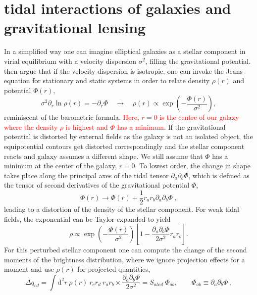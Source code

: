 \documentclass[a4paper,fleqn,usenatbib]{mnras}
\newcommand\spirou[1]{\textcolor{red}{#1}}
\newcommand{\dd}{\mathrm{d}}
\begin{document}
\section{tidal interactions of galaxies and gravitational lensing}\label{sect_tidal}
In a simplified way one can imagine elliptical galaxies as a stellar component in virial equilibrium with a velocity dispersion $\sigma^2$, filling the gravitational potential. \citet{piras_mass_2018} then argue that if the velocity dispersion is isotropic, one can invoke the Jeans-equation for stationary and static systems in order to relate density $\rho(r)$ and potential $\Phi(r)$,
\begin{equation}
\sigma^2\partial_r\ln\rho(r) = -\partial_r\Phi
\quad\rightarrow\quad
\rho(r) \propto \exp\left(-\frac{\Phi(r)}{\sigma^2}\right),
\label{eqn_jeans}
\end{equation}
reminiscent of the barometric formula. \spirou{Here, $r = 0$ is the centre of our galaxy where the density $\rho$ is highest and $\Phi$ has a minimum.} If the gravitational potential is distorted by external fields as the galaxy is not an isolated object, the equipotential contours get distorted correspondingly and the stellar component reacts and galaxy assumes a different shape.  We still assume that  $\Phi$ has a minimum at the center of the galaxy, $r = 0$. To lowest order, the change in shape takes place along the principal axes of the tidal tensor $\partial_a\partial_b\Phi$, which is defined as the tensor of second derivatives of the gravitational potential $\Phi$,
\begin{equation}
\Phi(r) \rightarrow \Phi(r) + \frac{1}{2}r_a r_b\partial_a\partial_b\Phi\:,
\label{eqn_tidal_taylor}
\end{equation}
leading to a distortion of the density of the stellar component. For weak tidal fields, the exponential can be Taylor-expanded to yield
\begin{equation}
\rho \propto 
\exp\left(-\frac{\Phi(r)}{\sigma^2}\right)\left[1-\frac{\partial_a\partial_b\Phi}{2\sigma^2}r_a r_b\right].
\end{equation}
For this perturbed stellar component one can compute the change of the second moments of the brightness distribution, where we ignore projection effects for a moment and use $\rho(r)$ for projected quantities,
\begin{equation}
\Delta q_{cd} = 
\int\dd^2r\:\rho(r)\: r_c r_d\: r_a r_b\times\frac{\partial_a\partial_b\Phi}{2\sigma^2} = S_{abcd}\:\Phi_{ab},   \qquad  \Phi_{ab} \equiv \partial_a\partial_b\Phi\,,
\label{eqn_2nd_moment}
\end{equation}
\end{document}
